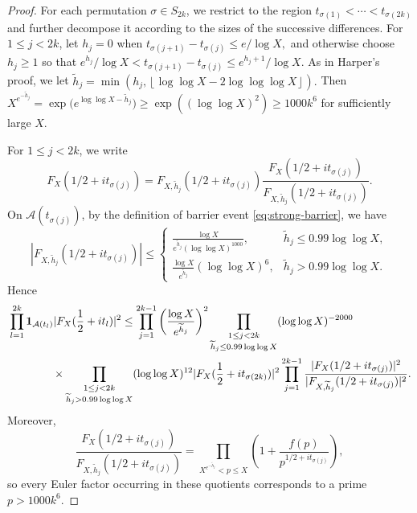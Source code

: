 \documentclass[a4paper,12pt,reqno]{amsart}
\numberwithin{equation}{section}
\theoremstyle{remark}
\begin{document}
\begin{proof}
 For each permutation
$\sigma\in S_{2k}$, we restrict to the region
\(
 t_{\sigma(1)}<\cdots<t_{\sigma(2k)}
\)
and further decompose it according to the sizes of the successive
differences.  For $1\leq j<2k$, let $h_j=0$ when
\(
 t_{\sigma(j+1)}-t_{\sigma(j)}
 \leq{e}/{\log X},
\)
and otherwise choose $h_j\geq1$ so that
\( {e^{h_j}}/{\log X}
 <
 t_{\sigma(j+1)}-t_{\sigma(j)}
 \leq
 {e^{h_j+1}}/{\log X}.
\)
As in Harper's proof, we let \( \widetilde h_j
 =
 \min\left(
 h_j,\left\lfloor
 \log\log X-2\log\log\log X
 \right\rfloor
 \right).
\)
Then \( X^{e^{-\widetilde h_j}}= \exp\big(e^{\log\log X-\widetilde h_j}\big)\geq \exp\left((\log\log X)^2\right)\geq1000k^6\) for sufficiently large $X$.  

For $1\leq j<2k$, we write
\[
 F_X(1/2+it_{\sigma(j)})
 =
 F_{X,\widetilde h_j}(1/2+it_{\sigma(j)})
 \frac{F_X(1/2+it_{\sigma(j)})}
 {F_{X,\widetilde h_j}(1/2+it_{\sigma(j)})}.
\]
On ${\mathcal A}(t_{\sigma(j)})$, by the definition of barrier event \eqref{eq:strong-barrier}, we have
\[
 |F_{X,\widetilde h_j}(1/2+it_{\sigma(j)})|
 \leq
 \begin{cases}
 \displaystyle
 \frac{\log X}
 {e^{\widetilde h_j}(\log\log X)^{1000}},
 & \widetilde h_j\leq0.99\log\log X,\\[2mm]
 \displaystyle
 \frac{\log X}{e^{\widetilde h_j}}(\log\log X)^6,
 & \widetilde h_j>0.99\log\log X.
 \end{cases}
\]
Hence
\begin{align}
 &\prod_{l=1}^{2k}\mathbf 1_{{\mathcal A}(t_l)}
 |F_X(\frac12+it_l)|^2\leq
 \prod_{j=1}^{2k-1}
 \left(\frac{\log X}{e^{\widetilde h_j}}\right)^2
 \prod_{\substack{1\leq j<2k\\
 \widetilde h_j\leq0.99\log\log X}}
 (\log\log X)^{-2000}
 \notag\\
 &\qquad\qquad\times \prod_{\substack{1\leq j<2k\\
 \widetilde h_j>0.99\log\log X}}
 (\log\log X)^{12}
 |F_X(\frac12+it_{\sigma(2k)})|^2
 \prod_{j=1}^{2k-1}
 \frac{|F_X(1/2+it_{\sigma(j)})|^2}
 {|F_{X,\widetilde h_j}(1/2+it_{\sigma(j)})|^2}.
 \label{eq:partial-product-bound}
\end{align}
Moreover,
\[
 \frac{F_X(1/2+it_{\sigma(j)})}
 {F_{X,\widetilde h_j}(1/2+it_{\sigma(j)})}
 =
 \prod_{X^{e^{-\widetilde h_j}}<p\leq X}
 \left(1+\frac{f(p)}{p^{1/2+it_{\sigma(j)}}}\right),
\]
so every Euler factor occurring in these quotients corresponds to a
prime $p>1000k^6$.


\end{proof}
\end{document}
